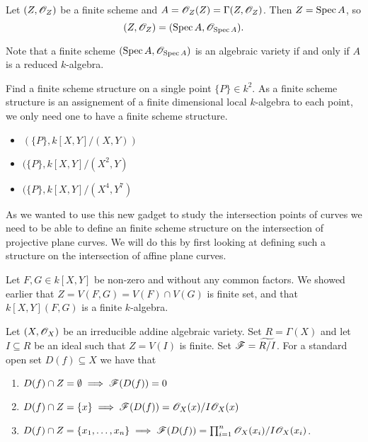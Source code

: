 \begin{definition}
Let $(Z,\mathscr{O}_Z)$ be a finite scheme and $A=\mathscr{O}_Z(Z)=\Gamma(Z,\mathscr{O}_Z)$. Then $Z=\operatorname{Spec} A$, so 
\begin{equation*}
    (Z,\mathscr{O}_Z) = (\operatorname{Spec} A, \mathscr{O}_{\operatorname{Spec} A}).
\end{equation*}
\end{definition}

Note that a finite scheme $(\operatorname{Spec} A, \mathscr{O}_{\operatorname{Spec} A})$ is an algebraic variety if and only if $A$ is a reduced $k$-algebra. 

\begin{problem}
Find a finite scheme structure on a single point $\{P\}\in k^2$. As a finite scheme structure is an assignement of a finite dimensional local $k$-algebra to each point, we only need one to have a finite scheme structure.  
\end{problem}
\begin{solution}
\begin{itemize}
    \item $(\{P\}, k[X,Y]/(X,Y))$ 
    \item $(\{P\}, k[X,Y]/(X^2,Y)$
    \item $(\{P\}, k[X,Y]/(X^4,Y^7)$
\end{itemize}
\end{solution}

As we wanted to use this new gadget to study the intersection points of curves we need to be able to define an finite scheme structure on the intersection of projective plane curves. We will do this by first looking at defining such a structure on the intersection of affine plane curves. 

Let $F,G\in k[X,Y]$ be non-zero and without any common factors. We showed earlier that $Z=V(F,G)=V(F)\cap V(G)$ is finite set, and that $k[X,Y](F,G)$ is a finite $k$-algebra. 

\begin{proposition}
Let $(X, \mathscr{O}_X)$ be an irreducible addine algebraic variety. Set $R=\Gamma(X)$ and let $I\subseteq R$ be an ideal such that $Z=V(I)$ is finite. Set $\mathscr{F} = \widetilde{R/I}$. For a standard open set $D(f)\subseteq X$ we have that
\begin{enumerate}
    \item $D(f)\cap Z = \emptyset \implies \mathscr{F}(D(f))=0$
    \item $D(f)\cap Z = \{x\} \implies \mathscr{F}(D(f))=\mathscr{O}_X(x)/I\mathscr{O}_X(x)$ 
    \item $D(f)\cap Z = \{x_1, \ldots, x_n\} \implies \mathscr{F}(D(f)) = \prod_{i=1}^n \mathscr{O}_X(x_i)/I\mathscr{O}_X(x_i)$. 
\end{enumerate}
\end{proposition}

